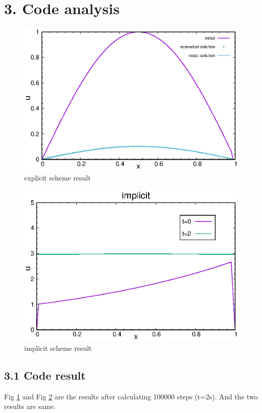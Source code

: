 \documentclass[12pt]{article}
\begin{document}
\section*{3. Code analysis}
\begin{figure}
    \centering
    \includegraphics{../plot/explicit.eps}
    \caption{explicit scheme result}
    \label{fig:explicit}
\end{figure}

\begin{figure}
    \centering
    \includegraphics{../plot/implicit.eps}
    \caption{implicit scheme result}
    \label{fig:implicit}
\end{figure}

\subsection*{3.1 Code result}
Fig \ref{fig:explicit} and Fig \ref{fig:implicit} are the results after calculating 100000 steps (t=2s). And the two results are same.
\end{document}
